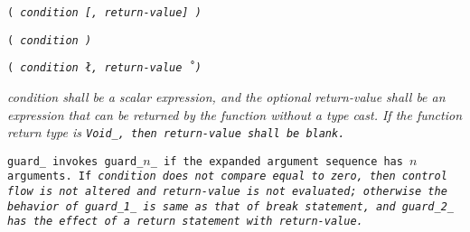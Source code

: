 
\s\s\s\tt{(} \it{condition} [\tt{,} \it{return-value}\opt]  \tt{)}

\s\tt{(} \it{condition} \tt{)}

\s\tt{(} \it{condition} \l\tt{,} \it{return-value}\opt\r\ \tt{)}


\it{condition} shall be a scalar expression, and the optional \it{return-value}
shall be an expression that can be returned by the function without a type cast.
If the function return type is \tt{Void_}, then \it{return-value} shall be blank.


\tt{guard_} invokes \tt{guard_}$n$\_ if the
expanded argument sequence has $n$ arguments.
If \it{condition} does not compare equal to zero,
then control flow is not altered and \it{return-value} is not evaluated;
otherwise the behavior of \tt{guard_1_} is same as that of \tt{break} statement,
and \tt{guard_2_} has the effect of a return statement with \it{return-value}.
